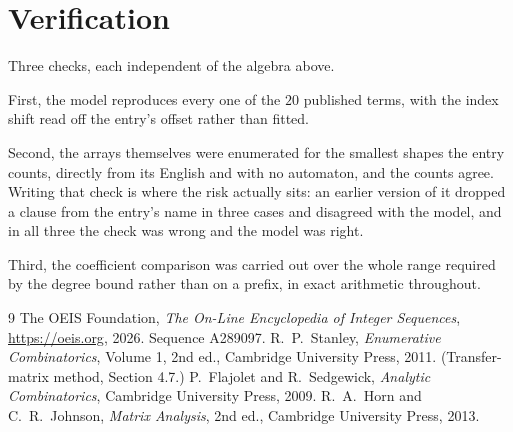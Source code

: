 \documentclass[11pt,a4paper]{article}
\theoremstyle{plain}
\theoremstyle{definition}
\begin{document}
\section{Verification}

Three checks, each independent of the algebra above.

First, the model reproduces every one of the $20$ published terms, with the index shift
read off the entry's offset rather than fitted.

Second, the arrays themselves were enumerated for the smallest shapes the entry counts,
directly from its English and with no automaton, and the counts agree. Writing that check is
where the risk actually sits: an earlier version of it dropped a clause from the entry's name
in three cases and disagreed with the model, and in all three the check was wrong and the model
was right.

Third, the coefficient comparison was carried out over the whole range required by the degree
bound rather than on a prefix, in exact arithmetic throughout.

\begin{thebibliography}{9}
 The OEIS Foundation, \emph{The On-Line Encyclopedia of Integer
Sequences}, \url{https://oeis.org}, 2026. Sequence A289097.
 R.~P.~Stanley, \emph{Enumerative Combinatorics}, Volume 1, 2nd ed.,
Cambridge University Press, 2011. (Transfer-matrix method, Section 4.7.)
 P.~Flajolet and R.~Sedgewick, \emph{Analytic Combinatorics}, Cambridge
University Press, 2009.
 R.~A.~Horn and C.~R.~Johnson, \emph{Matrix Analysis}, 2nd ed., Cambridge
University Press, 2013.
\end{thebibliography}
\end{document}
